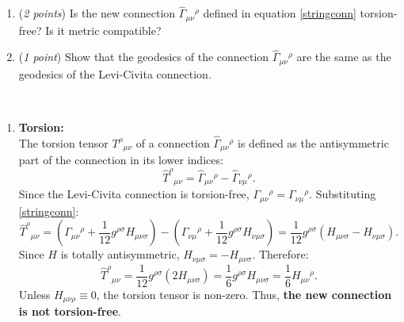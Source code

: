 \documentclass[12pt]{article}
\begin{document}
\begin{enumerate}[label=\alph*)]
\item (\emph{2 points}) Is the new connection $\hat\Gamma_{\mu\nu}{}^\rho$ defined in equation \eqref{stringconn} torsion-free? Is it metric compatible? 
\item (\emph{1 point}) Show that the geodesics of the connection $\hat\Gamma_{\mu\nu}{}^\rho$ are the same as the geodesics of the Levi-Civita connection. 
\end{enumerate}

\vspace{1em}
\\
\begin{enumerate}[label=\alph*)]
\item \textbf{Torsion:}\\
The torsion tensor $T^\rho{}_{\mu\nu}$ of a connection $\hat{\Gamma}_{\mu\nu}{}^\rho$ is defined as the antisymmetric part of the connection in its lower indices:
\begin{equation}
\hat{T}^\rho{}_{\mu\nu} = \hat{\Gamma}_{\mu\nu}{}^\rho - \hat{\Gamma}_{\nu\mu}{}^\rho.
\end{equation}
Since the Levi-Civita connection is torsion-free, $\Gamma_{\mu\nu}{}^\rho = \Gamma_{\nu\mu}{}^\rho$. Substituting \eqref{stringconn}:
\begin{equation}
\hat{T}^\rho{}_{\mu\nu} = \left(\Gamma_{\mu\nu}{}^\rho + \frac{1}{12} g^{\rho\sigma} H_{\mu\nu\sigma}\right) - \left(\Gamma_{\nu\mu}{}^\rho + \frac{1}{12} g^{\rho\sigma} H_{\nu\mu\sigma}\right) = \frac{1}{12} g^{\rho\sigma} \left( H_{\mu\nu\sigma} - H_{\nu\mu\sigma} \right).
\end{equation}
Since $H$ is totally antisymmetric, $H_{\nu\mu\sigma} = - H_{\mu\nu\sigma}$. Therefore:
\begin{equation}
\hat{T}^\rho{}_{\mu\nu} = \frac{1}{12} g^{\rho\sigma} \left( 2 H_{\mu\nu\sigma} \right) = \frac{1}{6} g^{\rho\sigma} H_{\mu\nu\sigma} = \frac{1}{6} H_{\mu\nu}{}^\rho.
\end{equation}
Unless $H_{\mu\nu\rho} \equiv 0$, the torsion tensor is non-zero. Thus, \textbf{the new connection is not torsion-free}.


\end{enumerate}
\end{document}
